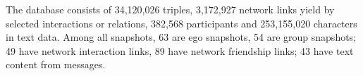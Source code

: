 The database consists of 34,120,026 triples, 3,172,927 network links yield by selected interactions or relations, 382,568 participants and 253,155,020 characters in text data. Among all snapshots, 63 are ego snapshots, 54 are group snapshots; 49 have network interaction links, 89 have network friendship links; 43 have text content from messages.
